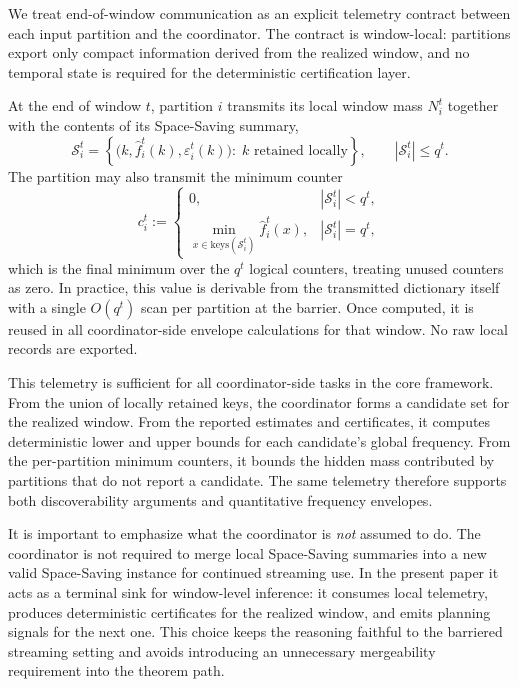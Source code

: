 \documentclass[sigconf, nonacm]{acmart}
\begin{document}
We treat end-of-window communication as an explicit telemetry contract between each input partition and the coordinator. The contract is window-local: partitions export only compact information derived from the realized window, and no temporal state is required for the deterministic certification layer.

At the end of window \(t\), partition \(i\) transmits its local window mass \(N_i^t\) together with the contents of its Space-Saving summary,
\[
\mathcal{S}_i^t
=
\left\{
\bigl(k,\hat f_i^t(k),\varepsilon_i^t(k)\bigr)
:\;
k \text{ retained locally}
\right\},
\qquad
|\mathcal{S}_i^t| \le q^t.
\]
The partition may also transmit the minimum counter
\[
c_i^t :=
\begin{cases}
0, & |\mathcal S_i^t| < q^t,\\[0.75ex]
\min_{x \in \mathrm{keys}(\mathcal{S}_i^t)} \hat f_i^t(x), & |\mathcal S_i^t| = q^t,
\end{cases}
\]
which is the final minimum over the \(q^t\) logical counters, treating unused counters as zero. In practice, this value is derivable from the transmitted dictionary itself with a single \(O(q^t)\) scan per partition at the barrier. Once computed, it is reused in all coordinator-side envelope calculations for that window. No raw local records are exported.

This telemetry is sufficient for all coordinator-side tasks in the core framework. From the union of locally retained keys, the coordinator forms a candidate set for the realized window. From the reported estimates and certificates, it computes deterministic lower and upper bounds for each candidate's global frequency. From the per-partition minimum counters, it bounds the hidden mass contributed by partitions that do not report a candidate. The same telemetry therefore supports both discoverability arguments and quantitative frequency envelopes.

It is important to emphasize what the coordinator is \emph{not} assumed to do. The coordinator is not required to merge local Space-Saving summaries into a new valid Space-Saving instance for continued streaming use. In the present paper it acts as a terminal sink for window-level inference: it consumes local telemetry, produces deterministic certificates for the realized window, and emits planning signals for the next one. This choice keeps the reasoning faithful to the barriered streaming setting and avoids introducing an unnecessary mergeability requirement into the theorem path.
\end{document}
